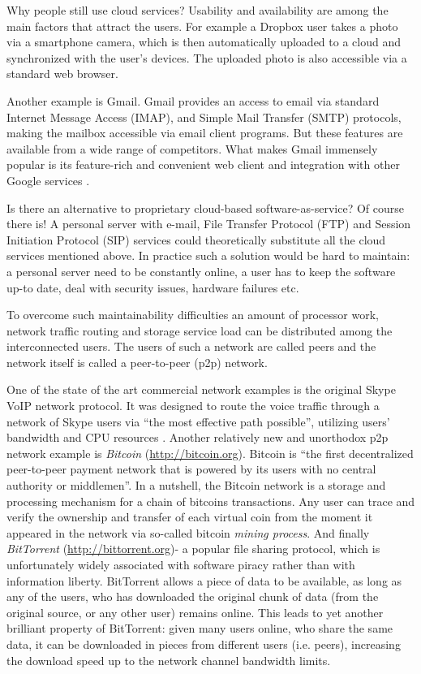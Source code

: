 Why people still use cloud services? Usability and availability are
among the main factors that attract the users. For example a Dropbox
user takes a photo via a smartphone camera, which is then automatically
uploaded to a cloud and synchronized with the user's devices.
The uploaded photo is also accessible via a standard web browser.

Another example is Gmail. Gmail provides an access to email via
standard Internet Message Access (IMAP), and Simple Mail
Transfer (SMTP) protocols, making the mailbox accessible
via email client programs. But these features are available from
a wide range of competitors. What makes Gmail immensely popular
is its feature-rich and convenient web client and integration with
other Google services \citep{gmail-popularity}.

Is there an alternative to proprietary cloud-based
software-as-service?
Of course there is! A personal server with e-mail,
File Transfer Protocol (FTP) and
Session Initiation Protocol (SIP)
services could theoretically substitute all the cloud services
mentioned above. In practice such a solution would be hard to maintain:
a personal server need to be constantly online, a user has to keep
the software up-to date, deal with security issues, hardware failures
etc.

To overcome such maintainability difficulties an amount of
processor work, network traffic routing and storage service load
can be distributed among the interconnected users.
The users of such a network are called peers and the network
itself is called a peer-to-peer (p2p) network.

One of the state of the art commercial \pp network examples is the
original Skype VoIP network protocol. It was designed to route the
voice traffic through a network of Skype users via
``the most effective path possible'', utilizing
users' bandwidth and CPU resources \citep{skype-p2p}.
Another relatively new and unorthodox p2p network example is
\emph{Bitcoin} (\url{http://bitcoin.org}). Bitcoin is
``the first decentralized peer-to-peer payment network that
is powered by its users with no central authority or middlemen''.
In a nutshell, the Bitcoin network is a storage and processing
mechanism for a chain of bitcoins transactions. Any user can
trace and verify the ownership and transfer of each virtual
coin from the moment it appeared in the network via
so-called bitcoin \emph{mining process}.
And finally \emph{BitTorrent} (\url{http://bittorrent.org})-
a popular file sharing protocol, which is
unfortunately widely associated with software piracy rather than
with information liberty. BitTorrent allows a piece of data to be
available, as long as any of the users, who has downloaded the original
chunk of data (from the original source, or any other user) remains
online. This leads to yet another brilliant property of BitTorrent:
given many users online, who share the same data, it can be downloaded
in pieces from different users (i.e. peers), increasing the download
speed up to the network channel bandwidth limits.

